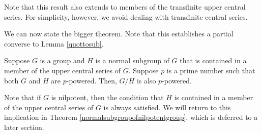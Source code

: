 \documentclass{ucetd}
\begin{document}
Note that this result also extends to members of the transfinite upper
central series. For simplicity, however, we avoid dealing with
transfinite central series.

We can now state the bigger theorem. Note that this establishes a
partial converse to Lemma \ref{quottosub}.

\begin{theorem}\label{normalinucspiequalsqpi}
  Suppose $G$ is a group and $H$ is a normal subgroup of $G$ that is
  contained in a member of the upper central series of $G$. Suppose
  $p$ is a prime number such that both $G$ and $H$ are
  $p$-powered. Then, $G/H$ is also $p$-powered.
\end{theorem}

Note that if $G$ is nilpotent, then the condition that $H$ is
contained in a member of the upper central series of $G$ is always
satisfied. We will return to this implication in Theorem
\ref{normalsubgroupofnilpotentgroup}, which is deferred to a later
section.
\end{document}

